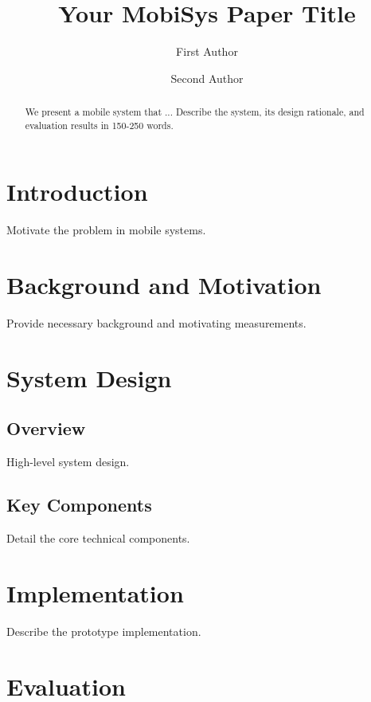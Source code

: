 \documentclass[sigconf,review]{acmart}
\begin{document}
\title{Your MobiSys Paper Title}

\author{First Author}

\author{Second Author}

\begin{abstract}
We present a mobile system that ... Describe the system, its design rationale, and evaluation results in 150-250 words.
\end{abstract}


\maketitle

\section{Introduction}
Motivate the problem in mobile systems.

\section{Background and Motivation}
Provide necessary background and motivating measurements.

\section{System Design}
\subsection{Overview}
High-level system design.

\subsection{Key Components}
Detail the core technical components.

\section{Implementation}
Describe the prototype implementation.

\section{Evaluation}
\end{document}
